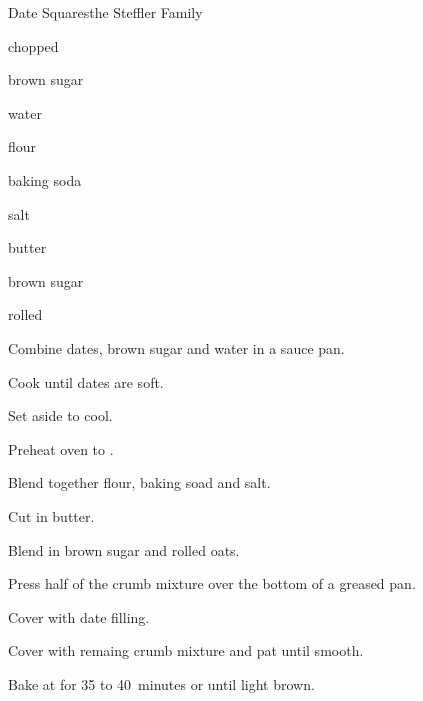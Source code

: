 \begin{recipe}{Date Squares}{the Steffler Family}{}

\begin{ingredients}
\item {} chopped 
\item {} brown sugar
\item {} water
\item {} flour
\item {} baking soda
\item \tp{\quarter} salt
\item {} butter
\item {} brown sugar
\item {} rolled 
\end{ingredients}

\begin{directions}
\item Combine dates, brown sugar and water in a sauce pan.
\item Cook until dates are soft.
\item Set aside to cool.
\item Preheat oven to .
\item Blend together flour, baking soad and salt.
\item Cut in butter.
\item Blend in brown sugar and rolled oats.
\item Press half of the crumb mixture over the bottom of a greased pan.
\item Cover with date filling.
\item Cover with remaing crumb mixture and pat until smooth.
\item Bake at for 35 to 40~minutes or until light brown.
\end{directions}
\end{recipe}
